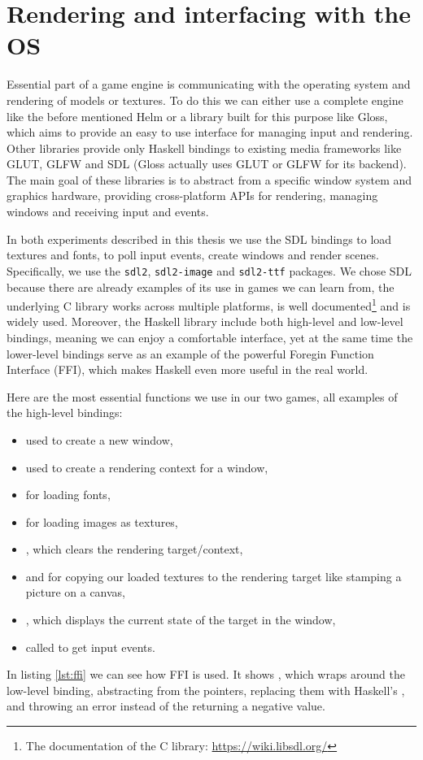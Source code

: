 \documentclass[
  digital, %
  color,   %
  table,   %
  oneside, %
  lof,     %
  lot,     %
]{fithesis3}
\newcommand{\packagename}{\texttt}
\begin{document}
\section{Rendering and interfacing with the OS}
\label{sect:aboutsdl}
Essential part of a game engine is communicating with the operating system
and rendering of models or textures. To do this we can
either use a complete engine like the before mentioned Helm or
a library built for this purpose like Gloss\cite{?}, which aims to provide an easy to use
interface for managing input and rendering. Other libraries
provide only Haskell bindings to existing media frameworks like GLUT, GLFW and SDL
(Gloss actually uses GLUT or GLFW for its backend). The main goal of these libraries is
to abstract from a specific window system and graphics hardware, providing
cross-platform APIs for rendering, managing windows and receiving input and events.

In both experiments described in this thesis we use the SDL bindings
to load textures and fonts, to poll input events, create windows and render scenes.
Specifically, we use the \packagename{sdl2}, \packagename{sdl2-image}
and \packagename{sdl2-ttf} packages. We chose SDL because there are already
examples of its use in games we can learn from,
the underlying C library works across multiple platforms,
is well documented\footnote{
    The documentation of the C library: \url{https://wiki.libsdl.org/}
} and is widely used. Moreover, the Haskell library
include both high-level and low-level bindings, meaning we can
enjoy a comfortable interface, yet at the same time the
lower-level bindings serve as an example of
the powerful Foregin Function Interface (FFI), which
makes Haskell even more useful in the real world.

Here are the most essential  functions we use in our two games,
all examples of the high-level bindings:
\begin{itemize}[\textendash]
    \item {} used to create a new window,
    \item {} used to create a rendering
    context for a window,
    \item {} for loading fonts, 
    \item {} for loading images as textures,
    \item {}, which clears the rendering target/context,
    \item {} and  for copying
    our loaded textures to the rendering target like stamping a picture on a canvas,
    \item {}, which displays the current state of the target in the window,
    \item {} called to get input events.
\end{itemize}
In listing \ref{lst:ffi} we can see how FFI is used. It shows ,
which wraps around the low-level binding, abstracting from the pointers,
replacing them with Haskell's ,
and throwing an error instead of the returning a negative value.
\end{document}
